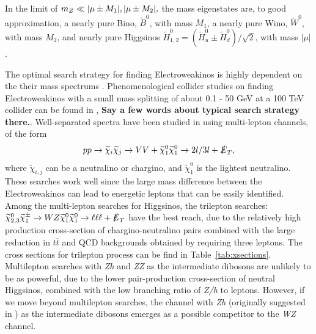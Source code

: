 \documentclass[a4paper,11pt]{article}
\newcommand{\Shufang}[1]{{\bf\color{Maroon}  #1}}
\renewcommand{\H}{\widetilde{H}^0}
\newcommand{\B}{\widetilde{B}^0}
\newcommand{\met}{{\slashed{E}_T}}
\begin{document}
In the limit of $m_Z \ll |\mu\pm M_1|, |\mu\pm M_2|,$ the mass eigenstates
are, to good approximation, a nearly pure Bino, $\B$, with mass $M_1$,
a nearly pure Wino, $\widetilde{W}^0$, with mass $M_2$, and nearly pure Higgsinos
$\H_{1,2} = (\H_u \pm \H_d)/\sqrt{2}$, with mass
$|\mu|$. 

The optimal search strategy for finding Electroweakinos is highly dependent on
the their mass spectrums \citep{Han:2013kza}.   Phenomenological collider studies on finding
Electroweakinos with a small mass splitting of about 0.1 - 50 GeV at a 100 TeV collider can be
found in \citep{Low:2014cba, Bramante:2014tba, Berlin:2015aba, Cirelli:2014dsa},
\Shufang{Say a few words about typical search strategy there.}.
Well-separated spectra have been studied in \citep{Gori:2014oua,
Acharya:2014pua} using
multi-lepton channels, of the form 
\begin{equation}
pp\rightarrow \widetilde{\chi}_i\widetilde{\chi}_j\rightarrow VV +
\widetilde{\chi}_1^0\widetilde{\chi}_1^0\rightarrow 2l/3l +  
\met,
\end{equation}
\noindent where $\widetilde{\chi}_{i,j}$ can be a neutralino or chargino, and
$\widetilde{\chi}_1^0$ is the lightest neutralino. These searches work well since
the large mass difference between the Electroweakinos can lead to energetic
leptons that can be easily identified. Among the multi-lepton searches for
Higgsinos, the trilepton searches: $\widetilde\chi_{2,3}^0\widetilde\chi_1^\pm\rightarrow WZ\widetilde\chi_1^0\widetilde\chi_1^0\rightarrow \ell\ell\ell + \met$ have the best reach, due to the relatively high production cross-section of
chargino-neutralino pairs combined with the large reduction in $t\overline{t}$
and QCD backgrounds obtained by requiring three leptons.   The cross sections for trilepton process can be find in Table~\ref{tab:xsections}. Multilepton searches
with \emph{Zh} and \emph{ZZ} as the intermediate dibosons are unlikely to be as powerful,
due to the lower pair-production cross-section of neutral Higgsinos, combined
with the low branching ratio of \emph{Z/h} to leptons. However, if we move beyond
multilepton searches, the channel with \emph{Zh} (originally suggested in
\citep{Han:2013kza}) as the intermediate dibosons emerges as a possible
competitor to the \emph{WZ} channel.  
\end{document}
